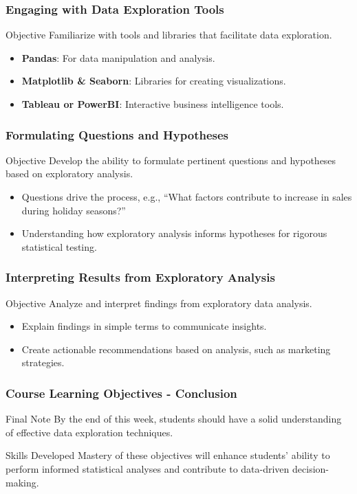 \documentclass[aspectratio=169]{beamer}
\begin{document}
\begin{frame}[fragile]
    \frametitle{Engaging with Data Exploration Tools}
    \begin{block}{Objective}
        Familiarize with tools and libraries that facilitate data exploration.
    \end{block}
    \begin{itemize}
        \item \textbf{Pandas}: For data manipulation and analysis.
        \item \textbf{Matplotlib \& Seaborn}: Libraries for creating visualizations.
        \item \textbf{Tableau or PowerBI}: Interactive business intelligence tools.
    \end{itemize}
\end{frame}

\begin{frame}[fragile]
    \frametitle{Formulating Questions and Hypotheses}
    \begin{block}{Objective}
        Develop the ability to formulate pertinent questions and hypotheses based on exploratory analysis.
    \end{block}
    \begin{itemize}
        \item Questions drive the process, e.g., “What factors contribute to increase in sales during holiday seasons?”
        \item Understanding how exploratory analysis informs hypotheses for rigorous statistical testing.
    \end{itemize}
\end{frame}

\begin{frame}[fragile]
    \frametitle{Interpreting Results from Exploratory Analysis}
    \begin{block}{Objective}
        Analyze and interpret findings from exploratory data analysis.
    \end{block}
    \begin{itemize}
        \item Explain findings in simple terms to communicate insights.
        \item Create actionable recommendations based on analysis, such as marketing strategies.
    \end{itemize}
\end{frame}

\begin{frame}[fragile]
    \frametitle{Course Learning Objectives - Conclusion}
    \begin{block}{Final Note}
        By the end of this week, students should have a solid understanding of effective data exploration techniques.
    \end{block}
    \begin{block}{Skills Developed}
        Mastery of these objectives will enhance students' ability to perform informed statistical analyses and contribute to data-driven decision-making.
    \end{block}
\end{frame}
\end{document}

